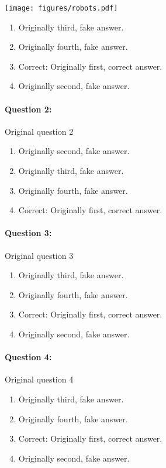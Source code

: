 \documentclass[9pt, twoside, twocolumn]{extarticle}
\renewcommand{\includegraphics}[2][]{\OldIncludegraphics[width=\linewidth, #1]{#2}}
\renewcommand{\caption}{}
\let\origfigure=\figure
\let\endorigfigure=\endfigure
\renewenvironment{figure}[1][]{%
  \origfigure[H]
}{%
  \endorigfigure
}
\begin{document}
\begin{figure}\centering
\texttt{[image: figures/robots.pdf]}
\caption{\end{figure}
\begin{enumerate}[label=\textbf{{\Alph*}},labelindent=0pt, labelsep=1.5em, parsep=0.2em]
\item Originally third, fake answer.
\item Originally fourth, fake answer.
\item Correct: Originally first, correct answer.
\item Originally second, fake answer.
\end{enumerate}
\paragraph{Question 2:}
Original question 2

\begin{enumerate}[label=\textbf{{\Alph*}},labelindent=0pt, labelsep=1.5em, parsep=0.2em]
\item Originally second, fake answer.
\item Originally third, fake answer.
\item Originally fourth, fake answer.
\item Correct: Originally first, correct answer.
\end{enumerate}
\paragraph{Question 3:}
Original question 3

\begin{enumerate}[label=\textbf{{\Alph*}},labelindent=0pt, labelsep=1.5em, parsep=0.2em]
\item Originally third, fake answer.
\item Originally fourth, fake answer.
\item Correct: Originally first, correct answer.
\item Originally second, fake answer.
\end{enumerate}
\paragraph{Question 4:}
Original question 4

\begin{enumerate}[label=\textbf{{\Alph*}},labelindent=0pt, labelsep=1.5em, parsep=0.2em]
\item Originally third, fake answer.
\item Originally fourth, fake answer.
\item Correct: Originally first, correct answer.
\item Originally second, fake answer.
\end{enumerate}
\end{document}
